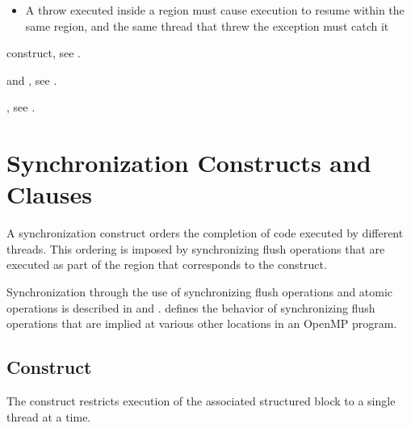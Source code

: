 \restrictions
\begin{cppspecific}
\begin{itemize}
\item A throw executed inside a  region must cause execution 
      to resume within the same  region, and the same thread 
      that threw the exception must catch it
\end{itemize}
\end{cppspecific}

\begin{crossrefs}
\item {} construct, see .

\item {} and , see
.

\item {}, see
.


\end{crossrefs}

\section{Synchronization Constructs and Clauses}
\label{sec:Synchronization Constructs and Clauses}
A synchronization construct orders the completion of code executed by
different threads. This ordering is imposed by synchronizing flush operations
that are executed as part of the region that corresponds to the construct.

Synchronization through the use of synchronizing flush operations and atomic
operations is described in  and 
. 
defines the behavior of synchronizing flush operations that are
implied at various other locations in an OpenMP program.

\subsection{ Construct}
\label{subsec:critical Construct}
\summary
The  construct restricts execution of the associated structured block to a
single thread at a time.

